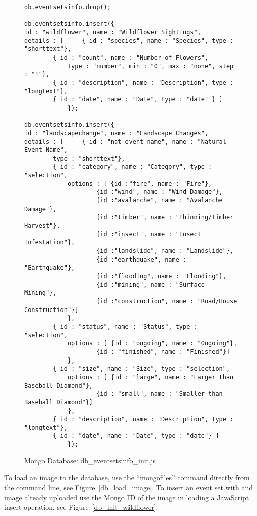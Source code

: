 \begin{figure} [tbh]                     
\caption{Mongo Database: db\_eventsetsinfo\_init.js}
\label{db_init_eventsetsinfo}    
\begin{lstlisting}
db.eventsetsinfo.drop();

db.eventsetsinfo.insert({ 
id : "wildflower", name : "Wildflower Sightings",
details : [ 	{ id : "species", name : "Species", type : "shorttext"},
		{ id : "count", name : "Number of Flowers", 
			type : "number", min : "0", max : "none", step : "1"},
		{ id : "description", name : "Description", type : "longtext"},
		{ id : "date", name : "Date", type : "date" } ]
			});
			
db.eventsetsinfo.insert({ 
id : "landscapechange", name : "Landscape Changes",
details : [ 	{ id : "nat_event_name", name : "Natural Event Name", 
		type : "shorttext"},
		{ id : "category", name : "Category", type : "selection", 
			options : [	{id :"fire", name : "Fire"},
					{id :"wind", name : "Wind Damage"},
					{id :"avalanche", name : "Avalanche Damage"},
					{id :"timber", name : "Thinning/Timber Harvest"},
					{id :"insect", name : "Insect Infestation"},
					{id :"landslide", name : "Landslide"},
					{id :"earthquake", name : "Earthquake"},
					{id :"flooding", name : "Flooding"},
					{id :"mining", name : "Surface Mining"},
					{id :"construction", name : "Road/House Construction"}]		   
			},
		{ id : "status", name : "Status", type : "selection", 
			options : [	{id : "ongoing", name : "Ongoing"},
					{id : "finished", name : "Finished"}]
			},
		{ id : "size", name : "Size", type : "selection", 
			options : [	{id : "large", name : "Larger than Baseball Diamond"},
					{id : "small", name : "Smaller than Baseball Diamond"}]
			},
		{ id : "description", name : "Description", type : "longtext"},
		{ id : "date", name : "Date", type : "date"} ]
			});
\end{lstlisting}
\end{figure}

To load an image to the database, use the ``mongofiles'' command directly from the command line, see Figure~\ref{db_load_image}. To insert an event set with and image already uploaded use the Mongo ID of the image in loading a JavaScript insert operation, see Figure~\ref{db_init_wildflower}.

